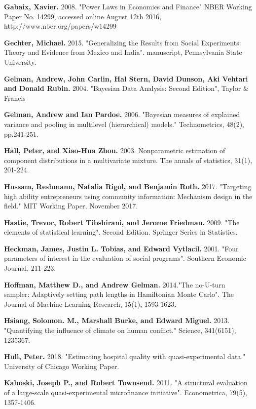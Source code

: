 \documentclass[AER]{AEA}
\begin{document}
\begin{thebibliography}{99}
 \textbf{ Gabaix, Xavier.} 2008. "Power Laws in Economics and Finance" NBER Working Paper No. 14299, accessed online August 12th 2016, http://www.nber.org/papers/w14299

 \textbf{ Gechter, Michael.} 2015. "Generalizing the Results from Social Experiments: Theory and Evidence from Mexico and India". manuscript, Pennsylvania State University.

 \textbf{ Gelman, Andrew, John Carlin, Hal Stern, David Dunson, Aki Vehtari and Donald Rubin.} 2004. "Bayesian Data Analysis: Second Edition", Taylor \& Francis

 \textbf{Gelman, Andrew and Ian Pardoe.} 2006. "Bayesian measures of explained variance and pooling in multilevel (hierarchical) models." Technometrics, 48(2), pp.241-251.

 \textbf{ Hall, Peter, and Xiao-Hua Zhou.} 2003. Nonparametric estimation of component distributions in a multivariate mixture. The annals of statistics, 31(1), 201-224.

 \textbf{ Hussam, Reshmann, Natalia Rigol, and Benjamin Roth.} 2017. "Targeting high ability entrepreneurs using community information: Mechanism design in the field." MIT Working Paper, November 2017.

 \textbf{ Hastie, Trevor, Robert Tibshirani, and Jerome Friedman.} 2009. "The elements of statistical learning". Second Edition. Springer Series in Statistics.

 \textbf{ Heckman, James, Justin L. Tobias, and Edward Vytlacil.} 2001. "Four parameters of interest in the evaluation of social programs". Southern Economic Journal, 211-223.

 \textbf{ Hoffman, Matthew D., and Andrew Gelman.} 2014."The no-U-turn sampler: Adaptively setting path lengths in Hamiltonian Monte Carlo". The Journal of Machine Learning Research, 15(1), 1593-1623.

 \textbf{ Hsiang, Solomon. M., Marshall Burke, and Edward Miguel.} 2013. "Quantifying the influence of climate on human conflict." Science, 341(6151), 1235367.

 \textbf{ Hull, Peter.} 2018. "Estimating hospital quality with quasi-experimental data." University of Chicago Working Paper.

 \textbf{ Kaboski, Joseph P., and Robert Townsend.} 2011. "A structural evaluation of a large-scale quasi-experimental microfinance initiative". Econometrica, 79(5), 1357-1406.


\end{thebibliography}
\end{document}
